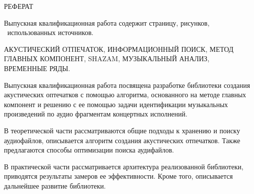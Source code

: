 \begin{center}
РЕФЕРАТ
\end{center}









Выпускная квалификационная работа содержит \pageref{LastPage} страницу, \totfig{}
рисунков, \ использованных источников.

АКУСТИЧЕСКИЙ ОТПЕЧАТОК, ИНФОРМАЦИОННЫЙ ПОИСК, МЕТОД ГЛАВНЫХ КОМПОНЕНТ, SHAZAM, МУЗЫКАЛЬНЫЙ АНАЛИЗ, ВРЕМЕННЫЕ РЯДЫ.

Выпускная квалификационная работа посвящена разработке библиотеки создания акустических оптечатков с помощью
алгоритма, основанного на методе главных компонент и решению с ее помощью задачи идентификации музыкальных произведений
по аудио фрагментам концертных исполнений.

В теоретической части рассматриваются общие подходы к хранению и поиску аудиофайлов, описывается алгоритм
создания акустических отпечатков. Также предлагаются способы оптимизации поиска аудифайлов.

В практической части рассматривается архитектура реализованной библиотеки, приводятся результаты замеров
ее эффективности. Кроме того, описывается дальнейшее развитие библиотеки.
